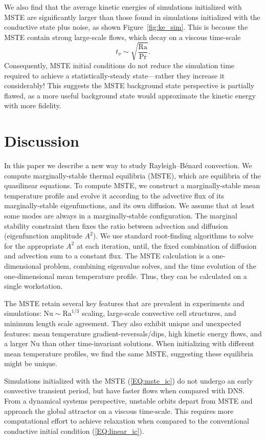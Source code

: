 \documentclass[reprint,amsmath,amssymb,aps]{revtex4-1}
\newcommand\Ra{\mathrm{Ra}}
\newcommand\Nu{\mathrm{Nu}}
\newcommand{\eq}[1]{(\ref{#1})}
\begin{document}
We also find that the average kinetic energies of simulations initialized with MSTE are significantly larger than those found in simulations initialized with the conductive state plus noise, as shown Figure~\ref{fig:ke_sim}. 
This is because the MSTE contain strong large-scale flows, which decay on a viscous time-scale
\begin{equation}
    t_{\nu} \sim \sqrt{\frac{\Ra}{\Pr}}. \nonumber
\end{equation}
Consequently, MSTE initial conditions do not reduce the simulation time required to achieve a statistically-steady state---rather they increase it considerably!
This suggests the MSTE background state perspective is partially flawed, as a more useful background state would approximate the kinetic energy with more fidelity.

\section{Discussion}\label{sec:Discussion}
In this paper we describe a new way to study Rayleigh–Bénard convection. 
We compute marginally-stable thermal equilibria (MSTE), which are equilibria of the quasilinear equations.
To compute MSTE, we construct a marginally-stable mean temperature profile and evolve it according to the advective flux of its marginally-stable eigenfunctions, and its own diffusion. 
We assume that at least some modes are always in a marginally-stable configuration. 
The marginal stability constraint then fixes the ratio between advection and diffusion (eigenfunction amplitude $A^2$). 
We use standard root-finding algorithms to solve for the appropriate $A^2$ at each iteration, until, the fixed combination of diffusion and advection sum to a constant flux.
The MSTE calculation is a one-dimensional problem, combining eigenvalue solves, and the time evolution of the one-dimensional mean temperature profile.
Thus, they can be calculated on a single workstation.

The MSTE retain several key features that are prevalent in experiments and simulations: $\Nu \sim\Ra^{1/3}$ scaling, large-scale convective cell structures, and minimum length scale agreement. 
They also exhibit unique and unexpected features: mean temperature gradient-reversals/dips, high kinetic energy flows, and a larger $\Nu$ than other time-invariant solutions. 
When initializing with different mean temperature profiles, we find the same MSTE, suggesting these equilibria might be unique.

Simulations initialized with the MSTE \eq{EQ:mste_ic} do not undergo an early convective transient period, but have faster flows when compared with DNS.
From a dynamical systems perspective, unstable orbits depart from MSTE and approach the global attractor on a viscous time-scale.
This requires more computational effort to achieve relaxation when compared to the conventional conductive initial condition \eq{EQ:linear_ic}.
\end{document}
